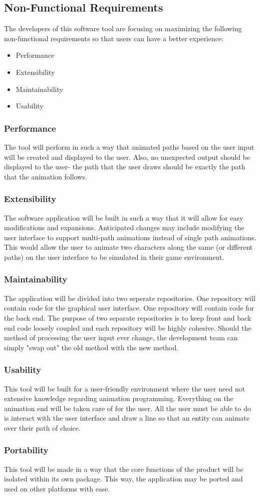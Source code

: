 \subsection{Non-Functional Requirements}
The developers of this software tool are focusing on maximizing the following non-functional requirements so that users can have a better experience:

\begin{itemize}
 \item Performance
 \item Extensibility
 \item Maintainability
 \item Usability
\end{itemize}

\subsubsection{Performance}
The tool will perform in such a way that animated paths based on the user input will be created and displayed to the user. Also, no unexpected output should be displayed to the user- the path that the user draws should be exactly the path that the animation follows.

\subsubsection{Extensibility}
The software application will be built in such a way that it will allow for easy modifications and expansions. Anticipated changes may include modifying the user interface to support multi-path animations instead of single path animations. This would allow the user to animate two characters along the same (or different paths) on the user interface to be simulated in their game environment.

\subsubsection{Maintainability}
The application will be divided into two seperate repositories. One repository will contain code for the graphical user interface. One repository will contain code for the back end. The purpose of two separate repositories is to keep front and back end code loosely coupled and each repository will be highly cohesive. Should the method of processing the user input ever change, the development team can simply "swap out" the old method with the new method.

\subsubsection{Usability}
This tool will be built for a user-friendly environment where the user need not extensive knowledge regarding animation programming. Everything on the animation end will be taken care of for the user. All the user must be able to do is interact with the user interface and draw a line so that an entity can animate over their path of choice.

\subsubsection{Portability}
This tool will be made in a way that the core functions of the product will be isolated within its own package. This way, the application may be ported and used on other platforms with ease.
